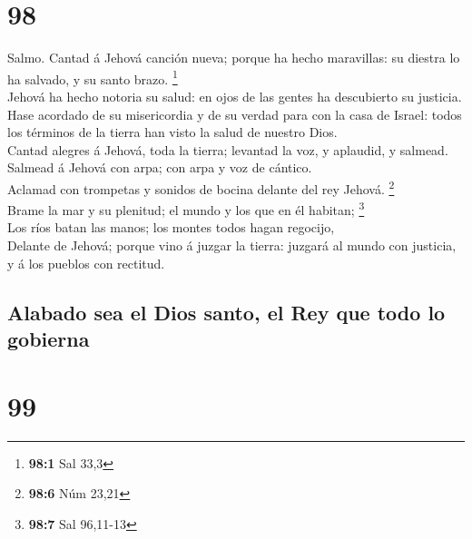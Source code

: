 \hypertarget{section-97}{%
\section{98}\label{section-97}}

 Salmo. Cantad á Jehová canción nueva; porque ha hecho
maravillas: su diestra lo ha salvado, y su santo brazo. \footnote{\textbf{98:1}
  Sal 33,3}\\
 Jehová ha hecho notoria su salud: en ojos de las gentes ha
descubierto su justicia.\\
 Hase acordado de su misericordia y de su verdad para con la
casa de Israel: todos los términos de la tierra han visto la salud de
nuestro Dios.\\
 Cantad alegres á Jehová, toda la tierra; levantad la voz, y
aplaudid, y salmead.\\
 Salmead á Jehová con arpa; con arpa y voz de cántico.\\
 Aclamad con trompetas y sonidos de bocina delante del rey
Jehová. \footnote{\textbf{98:6} Núm 23,21}\\
 Brame la mar y su plenitud; el mundo y los que en él
habitan; \footnote{\textbf{98:7} Sal 96,11-13}\\
 Los ríos batan las manos; los montes todos hagan
regocijo,\\
 Delante de Jehová; porque vino á juzgar la tierra: juzgará
al mundo con justicia, y á los pueblos con rectitud.

\hypertarget{alabado-sea-el-dios-santo-el-rey-que-todo-lo-gobierna}{%
\subsection{Alabado sea el Dios santo, el Rey que todo lo
gobierna}\label{alabado-sea-el-dios-santo-el-rey-que-todo-lo-gobierna}}

\hypertarget{section-98}{%
\section{99}\label{section-98}}


